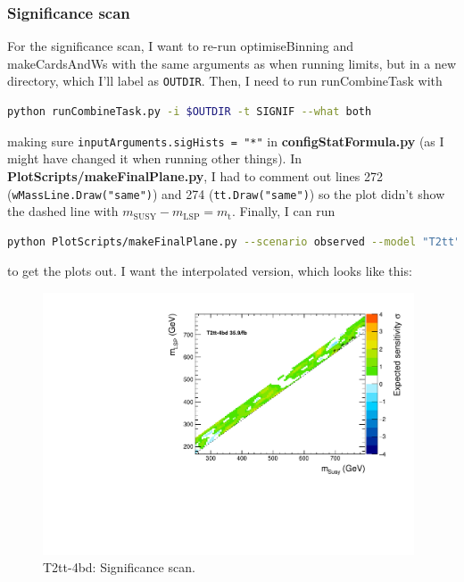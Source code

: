 \subsubsection{Significance scan}

For the significance scan, I want to re-run optimiseBinning and makeCardsAndWs with the same arguments as when running limits, but in a new directory, which I'll label as \texttt{OUTDIR}. Then, I need to run runCombineTask with

\begin{lstlisting}[belowskip=-0.7cm, language=sh, numbers=none]
python runCombineTask.py -i $OUTDIR -t SIGNIF --what both
\end{lstlisting}

making sure \texttt{inputArguments.sigHists = "*"} in \textbf{configStatFormula.py} (as I might have changed it when running other things). In \textbf{PlotScripts/makeFinalPlane.py}, I had to comment out lines 272 (\texttt{wMassLine.Draw("same")}) and 274 (\texttt{tt.Draw("same")}) so the plot didn't show the dashed line with $m_{\mathrm{SUSY}} - m_{\mathrm{LSP}} = m_{\mathrm{t}}$.  Finally, I can run

\begin{lstlisting}[belowskip=-0.7cm, language=sh, numbers=none]
python PlotScripts/makeFinalPlane.py --scenario observed --model "T2tt" -i $OUTDIR -o <output dir for plots> --mode pv --doubleTranspose --remake --remakePickle --smooth --task SIGNIF
\end{lstlisting}

to get the plots out. I want the interpolated version, which looks like this:

\begin{figure}[H]
\centering
\includegraphics[width=110mm]{./sec31/Significance_scan.pdf}
\caption{T2tt-4bd: Significance scan.}
\end{figure}

